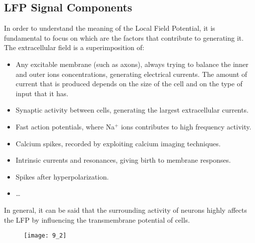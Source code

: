 \subsection{LFP Signal Components}
In order to understand the meaning of the Local Field Potential, it is fundamental to
focus on which are the factors that contribute to generating it. The extracellular field is
a superimposition of:
\begin{itemize}
    \item Any excitable membrane (such as axons), always trying to balance the inner
    and outer ions concentrations, generating electrical currents. The amount of current 
    that is produced depends on the size of the cell and on the type of input that it has.
    \item Synaptic activity between cells, generating the largest extracellular
    currents.
    \item Fast action potentials, where Na\({}^+\) ions contributes to high frequency
    activity.
    \item Calcium spikes, recorded by exploiting calcium imaging techniques.
    \item Intrinsic currents and resonances, giving birth to membrane responses.
    \item Spikes after hyperpolarization.
    \item \dots
\end{itemize}
In general, it can be said that the surrounding activity of neurons highly affects the
LFP by influencing the transmembrane potential of cells.
\begin{figure}[H]
    \texttt{[image: 9\_2]}
    \centering
\end{figure}

